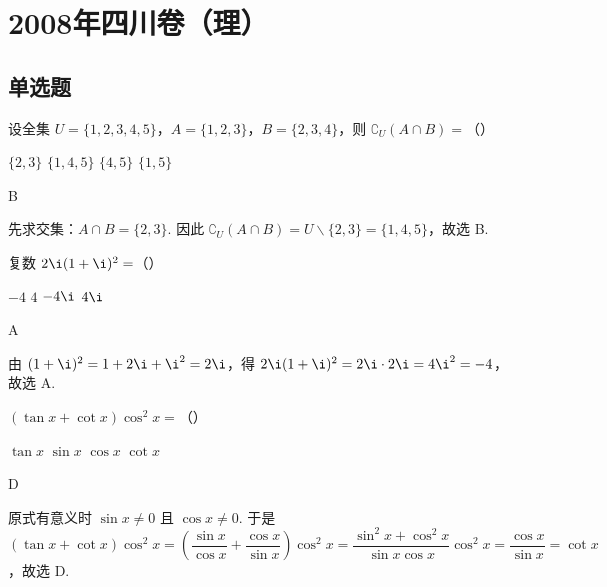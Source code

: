 \chapter{2008年四川卷（理）}

\section{单选题}

\begin{problem}
设全集 \(U=\{1,2,3,4,5\}\)，\(A=\{1,2,3\}\)，\(B=\{2,3,4\}\)，则 \(\complement_U(A\cap B)=\)（\quad）

\choices
    {\(\{2,3\}\)}
    {\(\{1,4,5\}\)}
    {\(\{4,5\}\)}
    {\(\{1,5\}\)}
\end{problem}

\begin{answer}
B
\end{answer}

\begin{solution}
先求交集：\(A\cap B=\{2,3\}\). 因此 \(\complement_U(A\cap B)=U\mathbin{\backslash}\{2,3\}=\{1,4,5\}\)，故选 B.
\end{solution}

\begin{problem}
复数 \(2\i(1+\i)^2=\)（\quad）

\choices
    {\(-4\)}
    {\(4\)}
    {\(-4\i\)}
    {\(4\i\)}
\end{problem}

\begin{answer}
A
\end{answer}

\begin{solution}
由 \((1+\i)^2=1+2\i+\i^2=2\i\)，得 \(2\i(1+\i)^2=2\i\cdot2\i=4\i^2=-4\)，故选 A.
\end{solution}

\begin{problem}
\((\tan x+\cot x)\cos^2x=\)（\quad）

\choices
    {\(\tan x\)}
    {\(\sin x\)}
    {\(\cos x\)}
    {\(\cot x\)}
\end{problem}

\begin{answer}
D
\end{answer}

\begin{solution}
原式有意义时 \(\sin x\ne0\) 且 \(\cos x\ne0\). 于是 \((\tan x+\cot x)\cos^2x=\left(\dfrac{\sin x}{\cos x}+\dfrac{\cos x}{\sin x}\right)\cos^2x=\dfrac{\sin^2x+\cos^2x}{\sin x\cos x}\cos^2x=\dfrac{\cos x}{\sin x}=\cot x\)，故选 D.
\end{solution}

